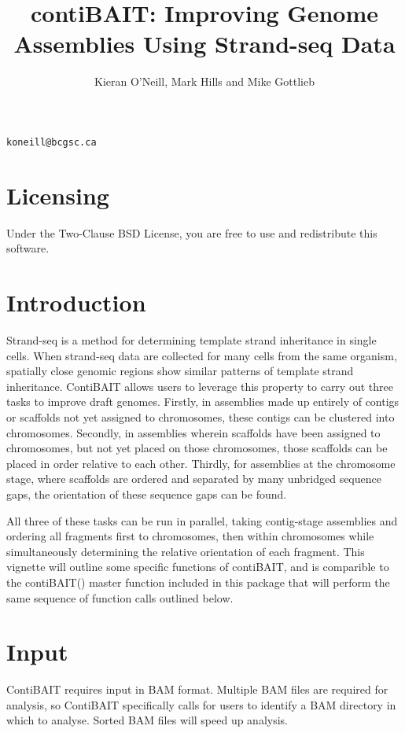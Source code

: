 \documentclass{article}
\title{contiBAIT: Improving Genome Assemblies Using Strand-seq Data}
\author{Kieran O'Neill, Mark Hills and Mike Gottlieb}
\begin{document}


\maketitle
\begin{center}
{\tt koneill@bcgsc.ca}
\end{center}

\textnormal{\normalfont}

\tableofcontents
\newpage



\section{Licensing}
Under the Two-Clause BSD License, you are free to use and redistribute this software.

\section{Introduction}
Strand-seq is a method for determining template strand inheritance in single cells.
When strand-seq data are collected for many cells from the same organism, spatially close genomic regions show similar patterns of template strand inheritance.
ContiBAIT allows users to leverage this property to carry out three tasks to improve draft genomes. Firstly, in assemblies made up entirely of contigs or scaffolds not yet assigned to chromosomes, these contigs can be clustered into chromosomes. Secondly, in assemblies wherein scaffolds have been assigned to chromosomes, but not yet placed on those chromosomes, those scaffolds can be placed in order relative to each other. Thirdly, for assemblies at the chromosome stage, where scaffolds are ordered and separated by many unbridged sequence gaps, the orientation of these sequence gaps can be found.  

All three of these tasks can be run in parallel, taking contig-stage assemblies and ordering all fragments first to chromosomes, then within chromosomes while simultaneously determining the relative orientation of each fragment. This vignette will outline some specific functions of contiBAIT, and is comparible to the contiBAIT() master function included in this package that will perform the same sequence of function calls outlined below.

\section{Input}
ContiBAIT requires input in BAM format. Multiple BAM files are required for analysis, so ContiBAIT specifically calls for users to identify a BAM directory in which to analyse. Sorted BAM files will speed up analysis. 
 
\end{document}
